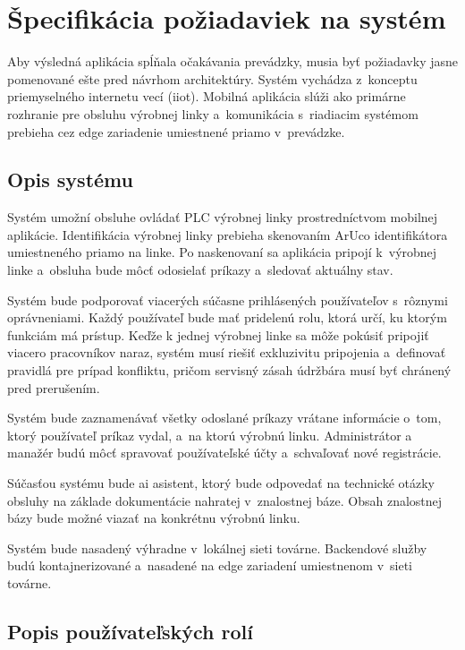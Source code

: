 \section{Špecifikácia požiadaviek na systém}\label{sec:specifikacia}

Aby výsledná aplikácia spĺňala očakávania prevádzky, musia byť požiadavky
jasne pomenované ešte pred návrhom architektúry. Systém vychádza z~konceptu
priemyselného internetu vecí (\acrshort{iiot}). Mobilná aplikácia slúži
ako primárne rozhranie pre obsluhu výrobnej linky a~komunikácia s~riadiacim
systémom prebieha cez edge zariadenie umiestnené priamo v~prevádzke.


\subsection{Opis systému}

Systém umožní obsluhe ovládať PLC výrobnej linky prostredníctvom mobilnej aplikácie.
Identifikácia výrobnej linky prebieha skenovaním ArUco identifikátora umiestneného
priamo na linke. Po naskenovaní sa aplikácia pripojí k~výrobnej linke a~obsluha
bude môcť odosielať príkazy a~sledovať aktuálny stav.

Systém bude podporovať viacerých súčasne prihlásených používateľov s~rôznymi
oprávneniami. Každý používateľ bude mať pridelenú rolu, ktorá určí, ku ktorým
funkciám má prístup. Keďže k jednej výrobnej linke sa môže pokúsiť pripojiť
viacero pracovníkov naraz, systém musí riešiť exkluzivitu pripojenia
a~definovať pravidlá pre prípad konfliktu, pričom servisný zásah údržbára musí
byť chránený pred prerušením.

Systém bude zaznamenávať všetky odoslané príkazy vrátane informácie o~tom,
ktorý používateľ príkaz vydal, a~na ktorú výrobnú linku. Administrátor a manažér
budú môcť spravovať používateľské účty a~schvaľovať nové registrácie.

Súčasťou systému bude \acrshort{ai} asistent, ktorý bude odpovedať na technické
otázky obsluhy na základe dokumentácie nahratej v~znalostnej báze. Obsah
znalostnej bázy bude možné viazať na konkrétnu výrobnú linku.

Systém bude nasadený výhradne v~lokálnej sieti továrne. Backendové služby budú
kontajnerizované a~nasadené na edge zariadení umiestnenom v~sieti továrne.

\subsection{Popis používateľských rolí}

